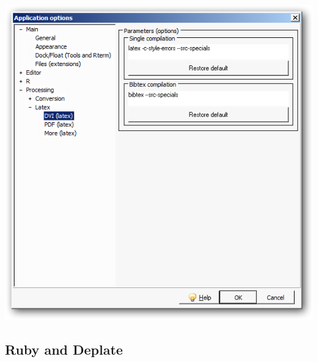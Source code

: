 \begin{itemize}
\begin{itemize}
        \includegraphics[scale=0.50]{./res/app_processing_latex_dvi.png}\\
    \end{itemize}
\end{itemize}


\subsection{Ruby and Deplate}

